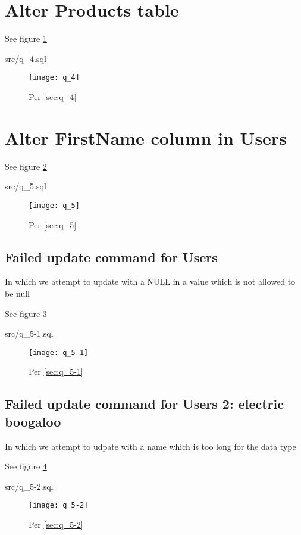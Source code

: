 \documentclass{article}
\begin{document}
\section{Alter Products table}

See figure \ref{fig:q_4}
\label{sec:q_4}
\begin{lstinputlisting}[float]{src/q_4.sql}
\end{lstinputlisting}

\begin{figure}[H]\centering
	\caption{Per \ref{sec:q_4}}
	\texttt{[image: q\_4]}
	\label{fig:q_4}
\end{figure}

\section{Alter FirstName column in Users}

See figure \ref{fig:q_5}
\label{sec:q_5}
\begin{lstinputlisting}[float]{src/q_5.sql}
\end{lstinputlisting}

\begin{figure}[H]\centering
	\caption{Per \ref{sec:q_5}}
	\texttt{[image: q\_5]}
	\label{fig:q_5}
\end{figure}

\subsection{Failed update command for Users}
In which we attempt to update with a NULL in a value which is not allowed to be null

See figure \ref{fig:q_5-1}
\label{sec:q_5-1}
\begin{lstinputlisting}[float]{src/q_5-1.sql}
\end{lstinputlisting}

\begin{figure}[H]\centering
	\caption{Per \ref{sec:q_5-1}}
	\texttt{[image: q\_5-1]}
	\label{fig:q_5-1}
\end{figure}

\subsection{Failed update command for Users 2: electric boogaloo}
In which we attempt to udpate with a name which is too long for the data type


See figure \ref{fig:q_5-2}
\label{sec:q_5-2}
\begin{lstinputlisting}[float]{src/q_5-2.sql}
\end{lstinputlisting}

\begin{figure}[H]\centering
	\caption{Per \ref{sec:q_5-2}}
	\texttt{[image: q\_5-2]}
	\label{fig:q_5-2}
\end{figure}
\end{document}
